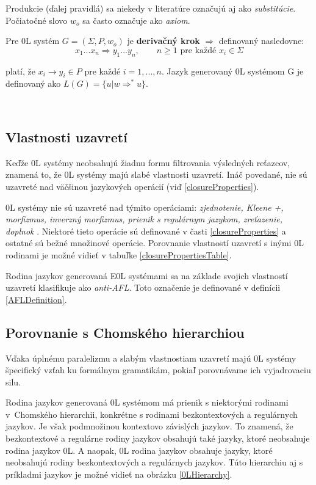 Produkcie (ďalej pravidlá) sa niekedy v literatúre označujú aj ako \textit{substitúcie}.
Počiatočné slovo $ w_o $ sa často označuje ako \textit{axiom}.


\begin{definition}
Pre 0L systém $G = (\Sigma, P, w_o)$ je \textbf{derivačný krok} $\Rightarrow$ definovaný nasledovne:
\[x_1...x_n \Rightarrow y_1...y_n, \quad\quad n\geq1 \text{ pre každé } x_i \in \Sigma \]

platí, že $x_i \to y_i \in P$ pre každé $i = 1,...,n$. Jazyk generovaný 0L systémom G je definovaný ako $L(G) = \{u | w \Rightarrow^*u\}$.

\end{definition}
\hfill\\

\subsection*{Vlastnosti uzavretí}
Keďže 0L systémy neobsahujú žiadnu formu filtrovania výsledných reťazcov, znamená to, že 0L systémy majú slabé vlastnosti uzavretí. Ináč povedané, nie sú uzavreté nad väčšinou jazykových operácií (viď \ref{closureProperties}).

0L systémy nie sú uzavreté nad týmito operáciami: \textit{zjednotenie, Kleene +, morfizmus, inverzný morfizmus, prienik s regulárnym jazykom, zreťazenie, doplnok} \cite{TIDPresentation}. Niektoré tieto operácie sú definované v časti \ref{closureProperties} a ostatné sú bežné množinové operácie. Porovnanie vlastností uzavretí s inými 0L rodinami je možné vidieť v tabuľke \ref{closurePropertiesTable}.

Rodina jazykov generovaná E0L systémami sa na základe svojich vlastností uzavretí klasifikuje ako \textit{anti-AFL}. Toto označenie je definované v definícii \ref{AFLDefinition}.

\subsection*{Porovnanie s Chomského hierarchiou}
Vďaka úplnému paralelizmu a slabým vlastnostiam uzavretí majú 0L systémy špecifický vzťah ku formálnym gramatikám, pokiaľ porovnávame ich vyjadrovaciu silu.

Rodina jazykov generovaná 0L systémom má prienik s niektorými rodinami v~Chomského hierarchii, konkrétne s rodinami bezkontextových a regulárnych jazykov. Je však podmnožinou kontextovo závislých jazykov. To znamená, že bezkontextové a regulárne rodiny jazykov obsahujú také jazyky, ktoré neobsahuje rodina jazykov 0L. A naopak, 0L rodina jazykov obsahuje jazyky, ktoré neobsahujú rodiny bezkontextových a regulárnych jazykov. Túto hierarchiu aj s príkladmi jazykov je možné vidieť na obrázku \ref{0LHierarchy}.


